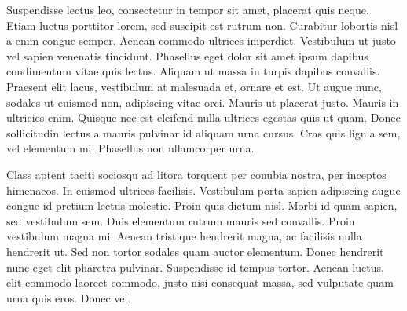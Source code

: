\documentclass[letterpaper,twocolumn,11pt]{report}
\begin{document}
Suspendisse lectus leo, consectetur in tempor sit amet, placerat quis neque.
Etiam luctus porttitor lorem, sed suscipit est rutrum non. Curabitur lobortis
nisl a enim congue semper. Aenean commodo ultrices imperdiet. Vestibulum ut
justo vel sapien venenatis tincidunt. Phasellus eget dolor sit amet ipsum
dapibus condimentum vitae quis lectus. Aliquam ut massa in turpis dapibus
convallis. Praesent elit lacus, vestibulum at malesuada et, ornare et est. Ut
augue nunc, sodales ut euismod non, adipiscing vitae orci. Mauris ut placerat
justo. Mauris in ultricies enim. Quisque nec est eleifend nulla ultrices egestas
quis ut quam. Donec sollicitudin lectus a mauris pulvinar id aliquam urna
cursus. Cras quis ligula sem, vel elementum mi. Phasellus non ullamcorper urna.


Class aptent taciti sociosqu ad litora torquent per conubia nostra, per inceptos
himenaeos. In euismod ultrices facilisis. Vestibulum porta sapien adipiscing
augue congue id pretium lectus molestie. Proin quis dictum nisl. Morbi id quam
sapien, sed vestibulum sem. Duis elementum rutrum mauris sed convallis. Proin
vestibulum magna mi. Aenean tristique hendrerit magna, ac facilisis nulla
hendrerit ut. Sed non tortor sodales quam auctor elementum. Donec hendrerit nunc
eget elit pharetra pulvinar. Suspendisse id tempus tortor. Aenean luctus, elit
commodo laoreet commodo, justo nisi consequat massa, sed vulputate quam urna
quis eros. Donec vel.  
\end{document}
